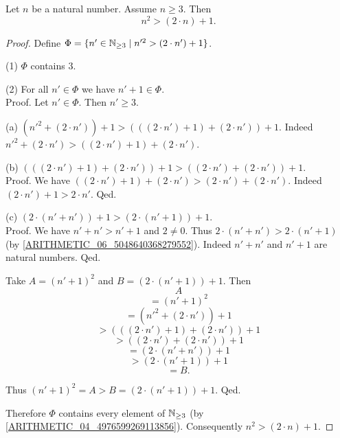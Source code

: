 \documentclass[10pt]{article}
\begin{document}
  \begin{forthel}
    \begin{proposition}
      Let $n$ be a natural number.
      Assume $n \geq 3$.
      Then \[ n^{2} > (2 \cdot n) + 1. \]
    \end{proposition}
    \begin{proof}
      Define $\Phi = \{ n' \in \mathbb{N}_{\geq 3} \mid n'^{2} > (2 \cdot n') + 1 \}$.

      (1) $\Phi$ contains $3$.

      (2) For all $n' \in \Phi$ we have $n' + 1 \in \Phi$. \\
      Proof.
        Let $n' \in \Phi$.
        Then $n' \geq 3$.

        (a) $(n'^{2} + (2 \cdot n')) + 1
        > (((2 \cdot n') + 1) + (2 \cdot n')) + 1$.
        Indeed $n'^{2} + (2 \cdot n') > ((2 \cdot n') + 1) + (2 \cdot n')$.

        (b) $(((2 \cdot n') + 1) + (2 \cdot n')) + 1
        > ((2 \cdot n') + (2 \cdot n')) + 1$. \\
        Proof.
          We have $((2 \cdot n') + 1) + (2 \cdot n')
          > (2 \cdot n') + (2 \cdot n')$.
          Indeed $(2 \cdot n') + 1 > 2 \cdot n'$.
        Qed.

        (c) $(2 \cdot (n' + n')) + 1 > (2 \cdot (n' + 1)) + 1$. \\
        Proof.
          We have $n' + n' > n' + 1$ and $2 \neq 0$.
          Thus $2 \cdot (n' + n') > 2 \cdot (n' + 1)$
          (by \cref{ARITHMETIC_06_5048640368279552}).
          Indeed $n' + n'$ and $n' + 1$ are natural numbers.
        Qed.

        Take $A = (n' + 1)^{2}$ and $B = (2 \cdot (n' + 1)) + 1$. %
        Then
        \[  A                                             \]
        \[    = (n' + 1)^{2}                              \]
        \[    = (n'^{2} + (2 \cdot n')) + 1               \]
        \[    > (((2 \cdot n') + 1) + (2 \cdot n')) + 1   \]  %
        \[    > ((2 \cdot n') + (2 \cdot n')) + 1         \]  %
        \[    = (2 \cdot (n' + n')) + 1                   \]
        \[    > (2 \cdot (n' + 1)) + 1                    \]  %
        \[    = B.                                        \]

        Thus $(n' + 1)^{2} = A > B = (2 \cdot (n' + 1)) + 1$.
      Qed.

      Therefore $\Phi$ contains every element of $\mathbb{N}_{\geq 3}$
      (by \cref{ARITHMETIC_04_4976599269113856}).
      Consequently $n^{2} > (2 \cdot n) + 1$.
    \end{proof}
  \end{forthel}
\end{document}
